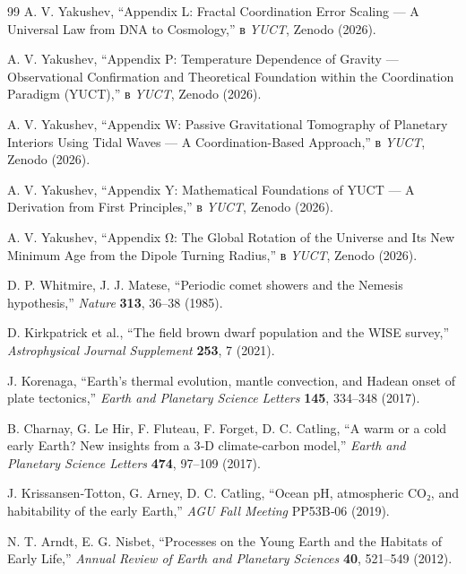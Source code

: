 \documentclass[11pt,a4paper]{article}
\begin{document}
\begin{thebibliography}{99}
		A. V. Yakushev, ``Appendix L: Fractal Coordination Error Scaling — A Universal Law from DNA to Cosmology,''
		в \emph{YUCT}, Zenodo (2026).
		
		A. V. Yakushev, ``Appendix P: Temperature Dependence of Gravity — Observational Confirmation and Theoretical Foundation within the Coordination Paradigm (YUCT),''
		в \emph{YUCT}, Zenodo (2026).
		
		A. V. Yakushev, ``Appendix W: Passive Gravitational Tomography of Planetary Interiors Using Tidal Waves — A Coordination-Based Approach,''
		в \emph{YUCT}, Zenodo (2026).
		
		A. V. Yakushev, ``Appendix Y: Mathematical Foundations of YUCT — A Derivation from First Principles,''
		в \emph{YUCT}, Zenodo (2026).
		
		A. V. Yakushev, ``Appendix Ω: The Global Rotation of the Universe and Its New Minimum Age from the Dipole Turning Radius,''
		в \emph{YUCT}, Zenodo (2026).
		
		D. P. Whitmire, J. J. Matese, ``Periodic comet showers and the Nemesis hypothesis,''
		\emph{Nature} \textbf{313}, 36–38 (1985).
		
		D. Kirkpatrick et al., ``The field brown dwarf population and the WISE survey,''
		\emph{Astrophysical Journal Supplement} \textbf{253}, 7 (2021).
		
		J. Korenaga, ``Earth’s thermal evolution, mantle convection, and Hadean onset of plate tectonics,''
		\emph{Earth and Planetary Science Letters} \textbf{145}, 334–348 (2017).
		
		B. Charnay, G. Le Hir, F. Fluteau, F. Forget, D. C. Catling, ``A warm or a cold early Earth? New insights from a 3‑D climate‑carbon model,''
		\emph{Earth and Planetary Science Letters} \textbf{474}, 97–109 (2017).
		
		J. Krissansen‑Totton, G. Arney, D. C. Catling, ``Ocean pH, atmospheric CO₂, and habitability of the early Earth,''
		\emph{AGU Fall Meeting} PP53B‑06 (2019).
		
		N. T. Arndt, E. G. Nisbet, ``Processes on the Young Earth and the Habitats of Early Life,''
		\emph{Annual Review of Earth and Planetary Sciences} \textbf{40}, 521–549 (2012).
		

\end{thebibliography}
\end{document}
